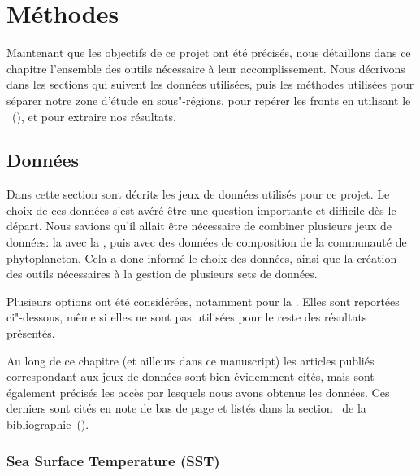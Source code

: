 
\chapter{Méthodes}
\addChpLof
\label{chp:methodes}
\graphicspath{{resources/méthodes}}

\minitoc%
\clearpage

Maintenant que les objectifs de ce projet ont été précisés, nous détaillons dans ce chapitre l'ensemble des outils nécessaire à leur accomplissement.
Nous décrivons dans les sections qui suivent les données utilisées, puis les méthodes utilisées pour séparer notre zone d'étude en sous"-régions, pour repérer les fronts en utilisant le ~(), et pour extraire nos résultats.

\section{Données}
\label{sec:donnees}

Dans cette section sont décrits les jeux de données utilisés pour ce projet.
Le choix de ces données s'est avéré être une question importante et difficile dès le départ.
Nous savions qu'il allait être nécessaire de combiner plusieurs jeux de données: la  avec la , puis avec des données de composition de la communauté de phytoplancton.
Cela a donc informé le choix des données, ainsi que la création des outils nécessaires à la gestion de plusieurs sets de données.

Plusieurs options ont été considérées, notamment pour la .
Elles sont reportées ci"-dessous, même si elles ne sont pas utilisées pour le reste des résultats présentés.

Au long de ce chapitre (et ailleurs dans ce manuscript) les articles publiés correspondant aux jeux de données sont bien évidemment cités, mais sont également précisés les accès par lesquels nous avons obtenus les données.
Ces derniers sont cités en note de bas de page et listés dans la section~ de la bibliographie~().

\subsection{Sea Surface Temperature (SST)}
\label{sec:donnees-sst}

